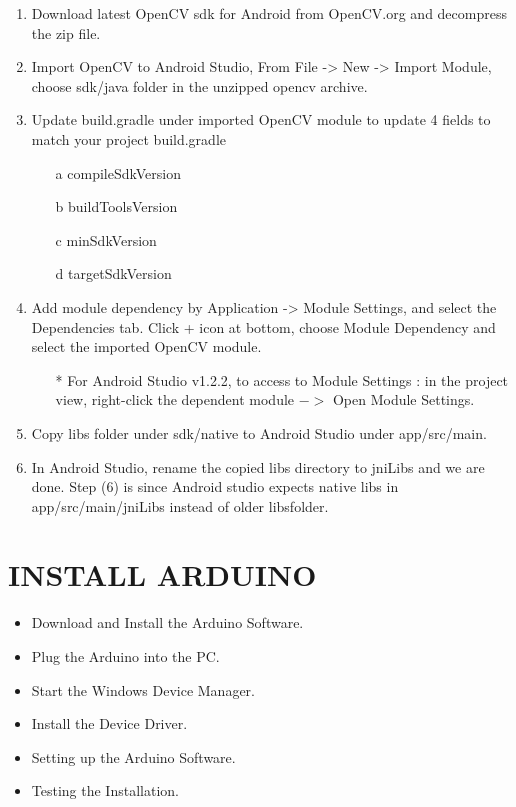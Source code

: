 \documentclass[11pt,a4paper,twoside]{report}
\begin{document}
\begin{enumerate}
\item Download latest OpenCV sdk for Android from OpenCV.org and decompress the zip file.
\item Import OpenCV to Android Studio, From File -> New -> Import Module, choose sdk/java folder in the unzipped opencv archive.
\item Update build.gradle under imported OpenCV module to update 4 fields to match your project build.gradle
\begin{enumerate}
	\item[a] compileSdkVersion
	\item[b] buildToolsVersion
	\item[c] minSdkVersion
	\item[d] targetSdkVersion
\end{enumerate} 
\item Add module dependency by Application -> Module Settings, and select the Dependencies tab. Click + icon at bottom, choose Module Dependency and select the imported OpenCV module.
\begin{itemize}
\item[*] For Android Studio v1.2.2, to access to Module Settings : in the project view, right-click the dependent module $->$ Open Module Settings.
\end{itemize}
\item Copy libs folder under sdk/native to Android Studio under app/src/main.
\item 	In Android Studio, rename the copied libs directory to jniLibs and we are done. Step (6) is since Android studio expects native libs in app/src/main/jniLibs instead of older libsfolder.

\end{enumerate}


\section{INSTALL ARDUINO}
\begin{itemize}
\item Download and Install the Arduino Software.
\item Plug the Arduino into the PC.
\item Start the Windows Device Manager.
\item Install the	 Device Driver.
\item Setting up the Arduino Software.
\item Testing the Installation.

\end{itemize}
\end{document}
